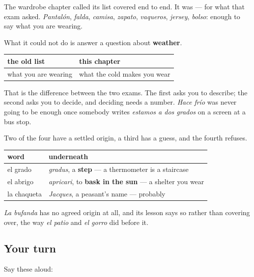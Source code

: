 \begin{grammarlens}[title={Grammar Lens: a list that was closed, reopened on purpose}]
The wardrobe chapter called its list covered end to end. It was — for what that exam asked. \emph{Pantalón}, \emph{falda}, \emph{camisa}, \emph{zapato}, \emph{vaqueros}, \emph{jersey}, \emph{bolso}: enough to say what you are wearing.

What it could not do is answer a question about \textbf{weather}.

\noindent
\begin{tabularx}{\linewidth}{@{}>{\raggedright\arraybackslash}X>{\raggedright\arraybackslash}X@{}}
\toprule
\textbf{the old list} & \textbf{this chapter} \\
\midrule
what you are wearing & what the cold makes you wear \\
\bottomrule
\end{tabularx}

That is the difference between the two exams. The first asks you to describe; the second asks you to decide, and deciding needs a number. \emph{Hace frío} was never going to be enough once somebody writes \emph{estamos a dos grados} on a screen at a bus stop.
\end{grammarlens}

\begin{cousinweb}
Two of the four have a settled origin, a third has a guess, and the fourth refuses.

\noindent
\begin{tabularx}{\linewidth}{@{}>{\raggedright\arraybackslash}X>{\raggedright\arraybackslash}X@{}}
\toprule
\textbf{word} & \textbf{underneath} \\
\midrule
el grado & \emph{gradus}, a \textbf{step} — a thermometer is a staircase \\
el abrigo & \emph{apricari}, to \textbf{bask in the sun} — a shelter you wear \\
la chaqueta & \emph{Jacques}, a peasant's name — probably \\
\bottomrule
\end{tabularx}

\emph{La bufanda} has no agreed origin at all, and its lesson says so rather than covering over, the way \emph{el patio} and \emph{el gorro} did before it.
\end{cousinweb}

\subsection*{Your turn}
Say these aloud:

